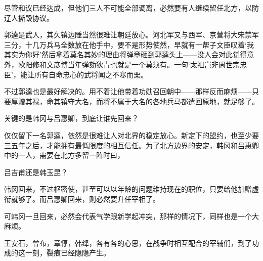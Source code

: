 尽管和议已经达成，但他们三人不可能全部调离，必然要有人继续留任北方，以防辽人撕毁协议。

郭逵是武人，其久镇边陲当然很难让朝廷放心。河北军又与西军、京营将大宋禁军三分，十几万兵马全数放在他手中，要不是形势使然，早就有一帮子文臣叹着‘我其实为你好’然后拿着莫名其妙的理由将弹章砸到郭逵头上——没人会对此觉得意外，欧阳修和文彦博当年弹劾狄青也就是一个莫须有。一句‘太祖岂非周世宗忠臣’，能让所有自命忠心的武将闻之不寒而栗。

不过郭逵也是最好解决的。用不着让他带着功勋召回朝中——那样反而麻烦——只要厚赠其禄，命其镇守大名，而将不属于大名的各地兵马都遣回原地，就足够了。

关键的是韩冈与吕惠卿，到底让谁先回来？

仅仅留下一名郭逵，依然是很难让人对北界的稳定放心。新定下的盟约，也至少要三五年之后，才能拥有最低限度的相互信任。为了北方边界的安定，韩冈和吕惠卿中的一人，需要在北方多留一阵时曰，

吕吉甫还是韩玉昆？

韩冈回来，不过枢密使，甚至可以以年龄的问题维持现在的职位，只要给他加赠虚衔就够了。而吕惠卿回来，则必然要升任宰相了。

可韩冈一旦回来，必然会代表气学跟新学起冲突，那样的情况下，同样也是一个大麻烦。

王安石，曾布，章惇，韩绛，各有各的心思，在战争时相互配合的宰辅们，到了功成的这一刻，裂痕已经隐隐产生。
